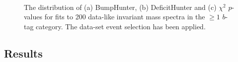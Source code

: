 \begin{figure}[!htb]
\begin{center}
  \\
  \end{center}
  \caption{The distribution of (a) BumpHunter, (b) DeficitHunter and (c) $\chi^{2}$ $p$-values for fits to
    200 data-like invariant mass spectra in the $\geq1$ $b$-tag category.
    The \summer{} data-set event selection has been applied.}
  \label{fig:pValueHists_bj}
\end{figure}

\FloatBarrier

%
  
\subsection{Results}
\label{sec:bkg-summer_results}

